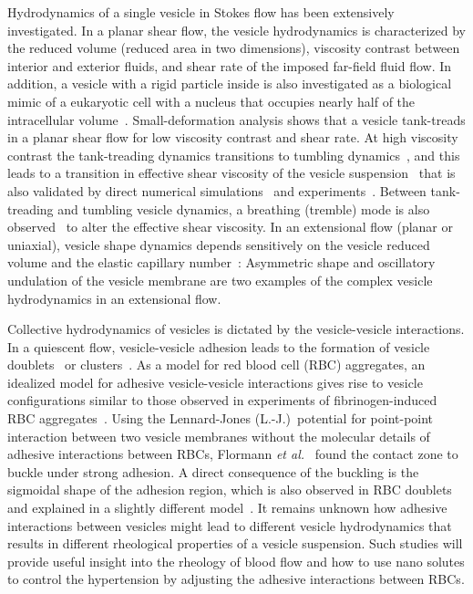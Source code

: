 \documentclass[prf,superscriptaddress,showpacs]{revtex4-1}
\begin{document}
Hydrodynamics of a single vesicle in Stokes flow has been extensively
investigated. In a planar shear flow, the vesicle hydrodynamics is
characterized by the reduced volume (reduced area in two dimensions),
viscosity contrast between interior and exterior fluids, and shear rate
of the imposed far-field fluid flow. In addition, a vesicle with a rigid
particle inside is also investigated as a biological mimic of a
eukaryotic cell with a nucleus that occupies nearly half of the
intracellular volume~\cite{Veerapaneni2011_PRL}. Small-deformation
analysis shows that a vesicle tank-treads in a planar shear flow for low
viscosity contrast and shear rate. At high viscosity contrast the
tank-treading dynamics transitions to tumbling
dynamics~\cite{Misbah2006_PRL, Vlahovska2007_PRE}, and this leads to a
transition in effective shear viscosity of the vesicle
suspension~\cite{Misbah2006_PRL,Vitkova2008_BJ} that is also validated
by direct numerical simulations~\cite{GhigliottiBibenMisbah2010_JFM} and
experiments~\cite{DeschampsKantsler2009_PNAS,
KantslerSegreSteinberg2008_EPL, ZabuskySegreDeschamps2011_PoF}.  Between
tank-treading and tumbling vesicle dynamics, a breathing (tremble) mode
is also observed~\cite{Misbah2006_PRL, KantslerSegreSteinberg2008_PRL,
ZhaoShaqfeh2011_JFM, SpannZhaoShaqfeh2014_PoF} to alter the effective
shear viscosity.  In an extensional flow (planar or
uniaxial), vesicle shape dynamics depends sensitively on the vesicle
reduced volume and the elastic capillary
number~\cite{KantslerSegreSteinberg2008_PRL, ZhaoShaqfeh2013_JFM,
Narsimhan2014_JFM, DahlNarsimhanGouveia2016_SoftMatt}: Asymmetric shape
and oscillatory undulation of the vesicle membrane are two examples of
the complex vesicle hydrodynamics in an extensional flow.

Collective hydrodynamics of vesicles is dictated by the vesicle-vesicle
interactions.  In a quiescent flow, vesicle-vesicle adhesion leads to
the formation of vesicle doublets~\cite{Ziherl2007_PRL,
ZiherlSvetina2007_PNAS} or
clusters~\cite{SvetinaZiherl2008_Bioelectrochemistry,
FlormannAouane2017_SciReports}.  As a model for red blood cell (RBC)
aggregates, an idealized model for adhesive vesicle-vesicle interactions
gives rise to vesicle configurations similar to those observed in
experiments of fibrinogen-induced RBC
aggregates~\cite{SvetinaZiherl2008_Bioelectrochemistry,
FlormannAouane2017_SciReports}.  Using the Lennard-Jones
(L.-J.)~potential for point-point interaction between two vesicle
membranes without the molecular details of adhesive interactions between
RBCs, Flormann {\em et al.}~\cite{FlormannAouane2017_SciReports} found the contact zone to buckle under
strong adhesion.  A direct
consequence of the buckling is the sigmoidal shape of the adhesion
region, which is also observed in RBC doublets and explained in a
slightly different model~\cite{ZiherlSvetina2007_PNAS}.  It remains
unknown how adhesive interactions between vesicles might lead to
different vesicle hydrodynamics that results in different rheological
properties of a vesicle suspension. Such studies will provide useful
insight into the rheology of blood flow and how to use nano solutes to
control the hypertension by adjusting the adhesive interactions between
RBCs.
\end{document}
